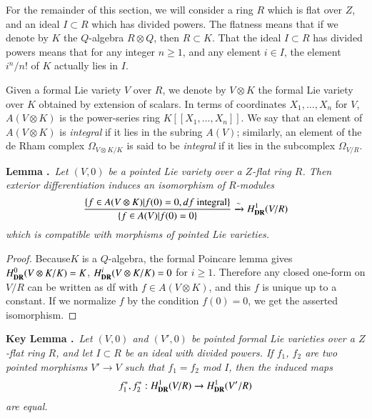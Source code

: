 For the remainder of this section, we will consider a ring $R$ which is flat over $Z$, and an ideal $I\subset R$ which has divided powers. The flatness means that if we denote by $K$ the $Q$-algebra $R\otimes Q$, then $R\subset K$. That the ideal $I\subset R$ has divided powers means that for any integer $n\geq 1$, and any element $i\in I$, the element $i^{n}/n!$ of $K$ actually lies in $I$.

Given a formal Lie variety $V$ over $R$, we denote by $V\otimes K$ the formal Lie variety over $K$ obtained by extension of scalars. In terms of coordinates $X_{1},\ldots,X_{n}$ for $V$, $A(V\otimes K)$ is the power-series ring $K[[X_{1},\ldots,X_{n}]]$. We say that an element of $A(V\otimes K)$ is {\em integral} if it lies in the subring $A(V)$; similarly, an element of the de Rham complex $\Omega_{V\otimes K/K}$ is said to be {\em integral} if it lies in the subcomplex $\Omega_{V/R}$.

\medskip
\noindent
{\bf Lemma .\label{art6-lem5.1.2}}~{\em Let $(V,0)$ be a pointed Lie variety over a $Z$-flat ring $R$. Then exterior differentiation induces an isomorphism of $R$-modules}
$$
\frac{\{f\in A(V\otimes K)|f(0)=0,df\text{ integral}\}}{\{f\in A(V)|f(0)=0\}}\xrightarrow{\sim}H^{1}_{\mathbf{DR}}(V/R)
$$
{\em which is compatible with morphisms of pointed Lie varieties.}

\begin{proof}
Because\pageoriginale $K$ is a $Q$-algebra, the formal Poincare lemma gives $H^{0}_{\mathbf{DR}}(V\otimes K/K)=K$, $H^{i}_{\mathbf{DR}}(V\otimes K/K)=0$ for $i\geq 1$. Therefore any closed one-form on $V/R$ can be written as df with $f\in A(V\otimes K)$, and this $f$ is unique up to a constant. If we normalize $f$ by the condition $f(0)=0$, we get the asserted isomorphism.
\end{proof}

\smallskip
\noindent
{\bf Key Lemma .\label{art6-keylem5.1.3}}~{\em Let $(V,0)$ and $(V',0)$ be pointed formal Lie varieties over a $Z$-flat ring $R$, and let $I\subset R$ be an ideal with divided powers. If $f_{1}$, $f_{2}$ are two pointed morphisms $V'\to V$ such that $f_{1}=f_{2}$ mod $I$, then the induced maps}
$$
f^{*}_{1}, f^{*}_{2} : H^{1}_{\mathbf{DR}}(V/R)\to H^{1}_{\mathbf{DR}}(V'/R)
$$
{\em are equal.}
\smallskip

